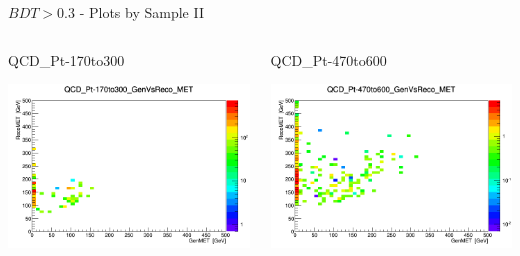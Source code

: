 \documentclass[8pt]{beamer}
\begin{document}
\begin{frame}{$BDT>0.3$ - Plots by Sample II}

\begin{columns}

\begin{block}{QCD\_Pt-170to300}
 
\centering
\includegraphics[width=\linewidth]{img/QCD_Pt-170to300_GenVsReco_MET.png} 
 
\end{block}

\begin{block}{QCD\_Pt-470to600}
 
\centering
\includegraphics[width=\linewidth]{img/QCD_Pt-470to600_GenVsReco_MET.png} 
 
\end{block}



\end{columns}
\end{frame}
\end{document}
